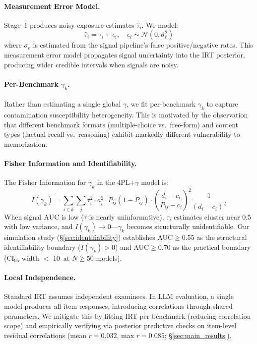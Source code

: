 \documentclass[11pt,a4paper]{article}
\newcommand{\pp}{\,\text{pp}}
\begin{document}
\paragraph{Measurement Error Model.}
Stage~1 produces noisy exposure estimates $\hat{\tau}_i$.
We model:
\begin{equation}
\hat{\tau}_i = \tau_i + \epsilon_i, \quad \epsilon_i \sim \mathcal{N}(0, \sigma_e^2)
\end{equation}
where $\sigma_e$ is estimated from the signal pipeline's false positive/negative rates.
This measurement error model propagates signal uncertainty into the IRT posterior, producing wider credible intervals when signals are noisy.

\paragraph{Per-Benchmark $\gamma_k$.}
Rather than estimating a single global $\gamma$, we fit per-benchmark $\gamma_k$ to capture contamination susceptibility heterogeneity.
This is motivated by the observation that different benchmark formats (multiple-choice vs.\ free-form) and content types (factual recall vs.\ reasoning) exhibit markedly different vulnerability to memorization.

\paragraph{Fisher Information and Identifiability.}
The Fisher Information for $\gamma_k$ in the 4PL+$\gamma$ model is:
\begin{equation}
I(\gamma_k) = \sum_{i \in k} \sum_j \tau_i^2 \cdot a_i^2 \cdot P_{ij}(1-P_{ij}) \cdot \left(\frac{d_i - c_i}{P_{ij} - c_i}\right)^2 \frac{1}{(d_i - c_i)^2}
\end{equation}
When signal AUC is low ($\hat{\tau}$ is nearly uninformative), $\tau_i$ estimates cluster near 0.5 with low variance, and $I(\gamma_k) \to 0$---$\gamma_k$ becomes structurally unidentifiable.
Our simulation study (\S\ref{sec:identifiability}) establishes AUC$\geq$0.55 as the structural identifiability boundary ($I(\gamma_k) > 0$) and AUC$\geq$0.70 as the practical boundary (CI$_{95}$ width $<$ 10\pp{} at $N\geq 50$ models).

\paragraph{Local Independence.}
Standard IRT assumes independent examinees.
In LLM evaluation, a single model produces all item responses, introducing correlations through shared parameters.
We mitigate this by fitting IRT per-benchmark (reducing correlation scope) and empirically verifying via posterior predictive checks on item-level residual correlations (mean $r = 0.032$, max $r = 0.085$; \S\ref{sec:main_results}).
\end{document}
